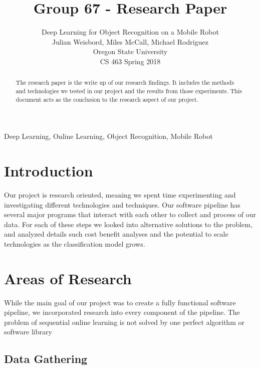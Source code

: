 \documentclass[journal]{IEEEtran}
\begin{document}
\title{Group 67 - Research Paper}
\author{Deep Learning for Object Recognition on a Mobile Robot\\
Julian Weisbord, Miles McCall, Michael Rodriguez \\
Oregon State University \\
CS 463 Spring 2018 \\
}
\maketitle

\begin{abstract}
The research paper is the write up of our research findings. It includes the methods and technologies we tested in our project and the results from those experiments. This document acts as the conclusion to the research aspect of our project.
\end{abstract}

\begin{IEEEkeywords}
	Deep Learning, Online Learning, Object Recognition, Mobile Robot
\end{IEEEkeywords}

\tableofcontents
\listoffigures

\section{Introduction}
Our project is research oriented, meaning we spent time experimenting and investigating different technologies and techniques. Our software pipeline has several major programs that interact with each other to collect and process of our data. For each of these steps we looked into alternative solutions to the problem, and analyzed details such cost benefit analyses and the potential to scale technologies as the classification model grows. 
   
\section{Areas of Research}
While the main goal of our project was to create a fully functional software pipeline, we incorporated research into every component of the pipeline. The problem of sequential online learning is not solved by one perfect algorithm or software library
    
  \subsection{Data Gathering}
\end{document}
